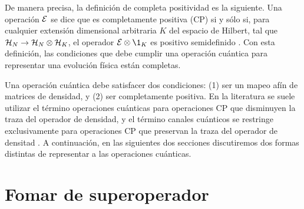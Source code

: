 De manera precisa, la definición de completa positividad es la siguiente.
Una operación $\mathcal{E}$ se dice que es completamente positiva (CP)
si y sólo si, para cualquier extensión dimensional arbitraria $K$ 
del espacio de Hilbert, tal que 
$\mathcal{H}_N \rightarrow \mathcal{H}_N \otimes \mathcal{H}_K$,
el operador $\E\otimes\1_K$ es positivo semidefinido 
\cite{bengtsson_zyczkowski_2017}. 
Con esta definición, las condiciones 
que debe cumplir una operación cuántica para representar una evolución física 
están completas.

Una operación cuántica debe satisfacer dos condiciones: (1)
ser un mapeo afín de matrices de densidad, y (2) ser completamente positiva. 
En la literatura se suele utilizar el término operaciones 
cuánticas para operaciones CP que disminuyen la traza 
del operador de densidad, y el término canales cuánticos 
se restringe exclusivamente para operaciones CP
que preservan la traza del 
operador de densitad \cite{bengtsson_zyczkowski_2017}. 
A continuación, en las siguientes dos secciones discutiremos 
dos formas distintas de representar a las operaciones cuánticas.



\section{Fomar de superoperador} %

